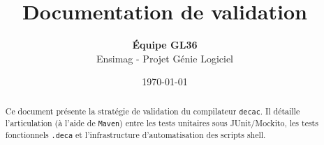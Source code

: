 \documentclass[a4paper,12pt]{article}
\title{
    \vspace{2cm}
    \textbf{\Huge Documentation de validation}\\
}
\author{
    \textbf{Équipe GL36} \\
    Ensimag - Projet Génie Logiciel
}
\date{\today}
\begin{document}
\maketitle

\begin{abstract}
\begin{center}
Ce document présente la stratégie de validation du compilateur \texttt{decac}. Il détaille l'articulation (à l'aide de \texttt{Maven}) entre les tests unitaires sous JUnit/Mockito, les tests fonctionnels \texttt{.deca} et l'infrastructure d'automatisation des scripts shell.
\end{center}
\end{abstract}


\tableofcontents
\newpage







\end{document}
